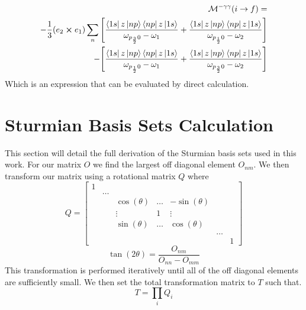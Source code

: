 \begin{equation}
\begin{split}
    \mathcal{M}^{-\gamma\gamma}(i\rightarrow f)=\\
    -\frac{1}{3}(e_2\cross e_1)
    \sum_{n}
    \Bigg[
    \frac{
    \bra{1s}z\ket{np}\bra{np}z\ket{1s}}     {\omega_{p_{\frac{3}{2}}0}-\omega_{1}}
    +
    \frac{
    \bra{1s}z\ket{np}\bra{np}z\ket{1s}} {\omega_{p_{\frac{1}{2}}0}-\omega_{2}}
    \Bigg]\\
    -
    \Bigg[
    \frac{
    \bra{1s}z\ket{np}\bra{np}z\ket{1s}} {\omega_{p_{\frac{1}{2}}0}-\omega_{1}}
    +
    \frac{
    \bra{1s}z\ket{np}\bra{np}z\ket{1s}} {\omega_{p_{\frac{3}{2}}0}-\omega_{2}}
    \Bigg]
    \end{split}
\end{equation}
Which is an expression that can be evaluated by direct calculation.

\section{Sturmian Basis Sets Calculation}
This section will detail the full derivation of the Sturmian basis sets used in this work. For our matrix \(O\) we find the largest off diagonal element \(O_{nm}\). We then transform our matrix using a rotational matrix \(Q\) where \cite{jacobi}
   \begin{equation}
     Q=\begin{bmatrix}
     1  &       &          &          &          &          &  \\
        &\hdots &          &          &          &          &  \\
        &       & \cos{(\theta)}  &\hdots   &-\sin{(\theta)}     & & \\  
        &       &\vdots &1      &\vdots & & \\  
                &       &\sin{(\theta)}   &\hdots   & \cos{(\theta)} & &\\
          &&&&&\hdots  \\    
            & & & & & &1
    \end{bmatrix}
 \end{equation}
  \begin{equation}
      \tan(2\theta)=\frac{O_{nm}}{O_{nn}-O_{mm}}
  \end{equation}
  This transformation is performed iteratively until all of the off diagonal elements are sufficiently small. We then set the total transformation matrix to \(T\) such that.
  \begin{equation}
      T=\prod_{i} Q_{i}
  \end{equation}

